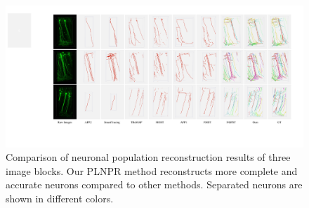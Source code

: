 \begin{figure}[t]
	\centering
	\includegraphics[width=1\textwidth]{./Illustrations/comparison_visor.pdf}
	\caption{Comparison of neuronal population reconstruction results of three image blocks. %
	Our PLNPR method reconstructs more complete and accurate neurons compared to other methods. Separated neurons are shown in different colors.
	}
	\label{fig:compare_VISoR}
\end{figure}


